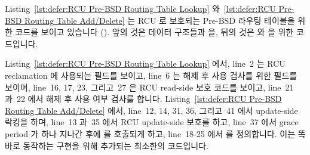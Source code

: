 Listing~\ref{lst:defer:RCU Pre-BSD Routing Table Lookup}
와~\ref{lst:defer:RCU Pre-BSD Routing Table Add/Delete}
는 RCU 로 보호되는 Pre-BSD 라우팅 테이블을 위한 코드를 보이고 있습니다
().
앞의 것은 데이터 구조들과  을, 뒤의 것은  와
 을 위한 코드입니다.

Listing~\ref{lst:defer:RCU Pre-BSD Routing Table Lookup} 에서, line~2 는 RCU
reclamation 에 사용되는  필드를 보이고, line~6 는 해제 후 사용 검사를
위한  필드를 보이며, line~16, 17, 23, 그리고~27 은 RCU read-side
보호 코드를 보이고, line~21 과~22 에서 해제 후 사용 여부 검사를 합니다.
Listing~\ref{lst:defer:RCU Pre-BSD Routing Table Add/Delete} 에서, line~12, 14,
31, 36, 그리고~41 에서 update-side 락킹을 하며, line~13 과~35 에서 RCU
update-side 보호를 하고, line~37 에서 grace period 가 하나 지나간 후에
 를 호출되게 하고, line~18-25 에서  를
정의합니다.
이는 똑바로 동작하는 구현을 위해 추가되는 최소한의 코드입니다.

